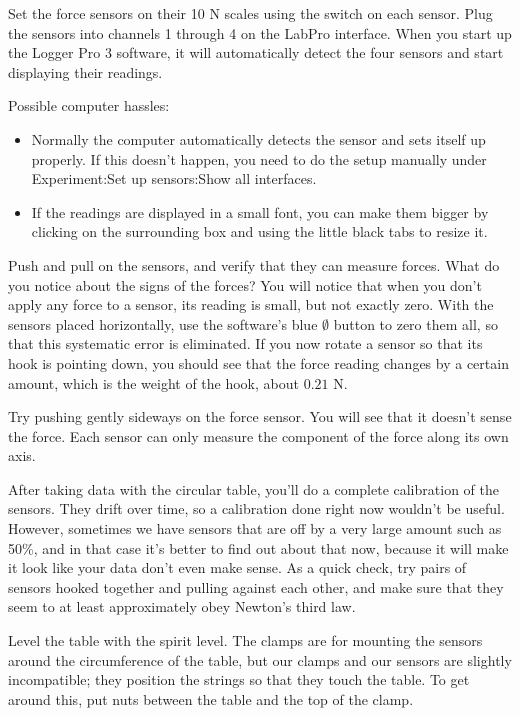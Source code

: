 Set the force sensors on their 10 N scales using the switch on each
sensor.
Plug the sensors into channels 1 through 4 on the LabPro interface.
When you start up the Logger Pro 3 software, it will automatically detect
the four sensors and start displaying their readings. 


Possible computer hassles:
\begin{itemize}
\item[] Normally the computer automatically detects the sensor and sets itself up
properly. If this doesn't happen, you need to do the setup manually under
Experiment:Set up sensors:Show all interfaces.
\item[] If the readings are displayed in a small font, you can make them bigger
by clicking on the surrounding box and using the little black tabs to resize it.
\end{itemize}

Push and pull on the sensors, and verify that they can measure forces.
What do you notice about the signs of the forces?
You will notice that when you don't apply any force to a sensor, its reading
is small, but not exactly zero.
With the sensors placed horizontally, use the software's blue $\emptyset$ button to zero them all, so that
this systematic error is eliminated. If you now rotate a sensor so that its hook
is pointing down, you should see that the force reading changes by a certain amount,
which is the weight of the hook, about $0.21$ N.

Try pushing gently sideways on the force sensor. You will see that it doesn't
sense the force.
Each sensor can only measure the component of the force along its
own axis.

After taking data with the circular table, you'll do a complete calibration of the
sensors. They drift over time, so a calibration done right now wouldn't be useful.
However, sometimes we have sensors that are off by a very large
amount such as 50\%, and in that case it's better to find out about that now, because
it will make it look like your data don't even make sense. As a quick check, try
pairs of sensors hooked together and pulling against each other, and make sure that
they seem to at least approximately obey Newton's third law.

Level the table with the spirit level. The clamps are for mounting the sensors around
the circumference of the table, but our clamps and our sensors are slightly incompatible;
they position the strings so that they touch the table. To get around this, put
nuts between the table and the top of the clamp.

